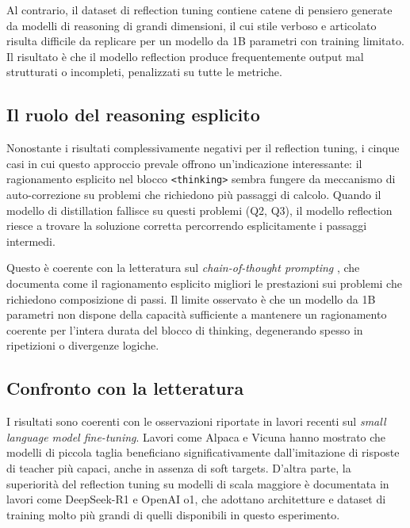 Al contrario, il dataset di reflection tuning contiene catene di
pensiero generate da modelli di reasoning di grandi dimensioni,
il cui stile verboso e articolato risulta difficile da replicare
per un modello da 1B parametri con training limitato. Il risultato
è che il modello reflection produce frequentemente output mal
strutturati o incompleti, penalizzati su tutte le metriche.

\subsection{Il ruolo del reasoning esplicito}

Nonostante i risultati complessivamente negativi per il reflection
tuning, i cinque casi in cui questo approccio prevale offrono
un'indicazione interessante: il ragionamento esplicito nel blocco
\texttt{<thinking>} sembra fungere da meccanismo di auto-correzione
su problemi che richiedono più passaggi di calcolo. Quando il modello
di distillation fallisce su questi problemi (Q2, Q3), il modello
reflection riesce a trovare la soluzione corretta percorrendo
esplicitamente i passaggi intermedi.

Questo è coerente con la letteratura sul \emph{chain-of-thought
prompting} \cite{wei2022chain}, che documenta come il
ragionamento esplicito migliori le prestazioni sui problemi che
richiedono composizione di passi. Il limite osservato è che un
modello da 1B parametri non dispone della capacità sufficiente
a mantenere un ragionamento coerente per l'intera durata del blocco
di thinking, degenerando spesso in ripetizioni o divergenze logiche.

\subsection{Confronto con la letteratura}

I risultati sono coerenti con le osservazioni riportate in lavori
recenti sul \emph{small language model fine-tuning}. Lavori come
Alpaca \cite{taori2023alpaca} e Vicuna \cite{chiang2023vicuna}
hanno mostrato che modelli di piccola taglia beneficiano
significativamente dall'imitazione di risposte di teacher più
capaci, anche in assenza di soft targets. D'altra parte, la
superiorità del reflection tuning su modelli di scala maggiore
è documentata in lavori come DeepSeek-R1 \cite{deepseekr1_2025}
e OpenAI o1, che adottano architetture e dataset di training
molto più grandi di quelli disponibili in questo esperimento.

